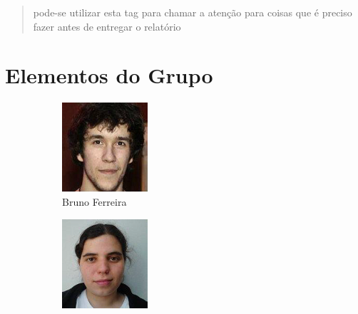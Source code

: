 \documentclass[11pt, a4paper, oneside]{article}
\newcommand{\todo}[1] {\textcolor{BrickRed}{\begin{quote}#1\end{quote}}}
\begin{document}
\todo{pode-se utilizar esta tag para chamar a atenção para coisas que é preciso fazer antes de entregar o relatório}

\newpage
\section{Elementos do Grupo}
\begin{figure}[h!]
\centering
\begin{subfigure}{.33\textwidth}
  \centering
  \includegraphics[width=0.8\linewidth]{60}
  \caption{Bruno Ferreira  }
\end{subfigure}%
\begin{subfigure}{.33\textwidth}
  \centering
  \includegraphics[width=0.8\linewidth]{107}

\end{subfigure}
\end{figure}
\end{document}
